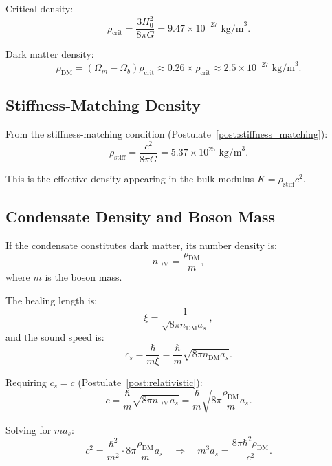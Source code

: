 \documentclass[11pt,a4paper]{article}
\newcommand{\rhocrit}{\ensuremath{\rho_{\mathrm{crit}}}}
\newcommand{\rhostiff}{\ensuremath{\rho_{\mathrm{stiff}}}}
\theoremstyle{definition}
\theoremstyle{remark}
\begin{document}
Critical density:
\begin{equation}
\rhocrit = \frac{3H_0^2}{8\pi G} = 9.47 \times 10^{-27} \text{ kg/m}^3.
\end{equation}

Dark matter density:
\begin{equation}
\rho_{\mathrm{DM}} = (\Omega_m - \Omega_b)\rhocrit \approx 0.26 \times \rhocrit \approx 2.5 \times 10^{-27} \text{ kg/m}^3.
\end{equation}

\subsection{Stiffness-Matching Density}
\label{sec:stiffness_density}

From the stiffness-matching condition (Postulate~\ref{post:stiffness_matching}):
\begin{equation}
\rhostiff = \frac{c^2}{8\pi G} = 5.37 \times 10^{25} \text{ kg/m}^3.
\end{equation}

This is the effective density appearing in the bulk modulus $K = \rhostiff c^2$.

\subsection{Condensate Density and Boson Mass}
\label{sec:condensate_density}

If the condensate constitutes dark matter, its number density is:
\begin{equation}
n_{\mathrm{DM}} = \frac{\rho_{\mathrm{DM}}}{m},
\end{equation}
where $m$ is the boson mass.

The healing length is:
\begin{equation}
\xi = \frac{1}{\sqrt{8\pi n_{\mathrm{DM}} a_s}},
\end{equation}
and the sound speed is:
\begin{equation}
c_s = \frac{\hbar}{m\xi} = \frac{\hbar}{m}\sqrt{8\pi n_{\mathrm{DM}} a_s}.
\end{equation}

Requiring $c_s = c$ (Postulate~\ref{post:relativistic}):
\begin{equation}
\label{eq:cs_condition}
c = \frac{\hbar}{m}\sqrt{8\pi n_{\mathrm{DM}} a_s} = \frac{\hbar}{m}\sqrt{8\pi \frac{\rho_{\mathrm{DM}}}{m} a_s}.
\end{equation}

Solving for $m a_s$:
\begin{equation}
c^2 = \frac{\hbar^2}{m^2} \cdot 8\pi \frac{\rho_{\mathrm{DM}}}{m} a_s \quad \Rightarrow \quad m^3 a_s = \frac{8\pi\hbar^2 \rho_{\mathrm{DM}}}{c^2}.
\end{equation}
\end{document}
